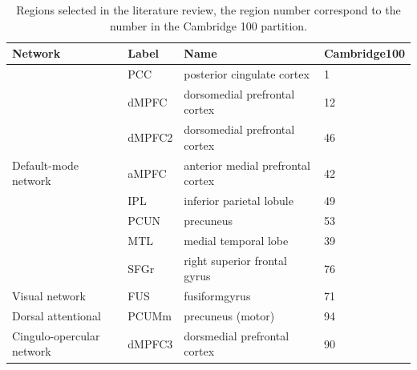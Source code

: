 \documentclass[authoryear]{elsarticle}
\begin{document}


\begin{table}[H]
\begin{center}
\begin{tabular}{l l l l}
\bfseries{Network} & \bfseries{Label} & \bfseries{Name} & \bfseries{Cambridge100}\\
\hline
 & PCC & posterior cingulate cortex & 1\\
 & dMPFC & dorsomedial prefrontal cortex & 12\\
 & dMPFC2 & dorsomedial prefrontal cortex & 46\\
Default-mode network & aMPFC & anterior medial prefrontal cortex & 42\\
 & IPL & inferior parietal lobule & 49\\
 & PCUN & precuneus & 53\\
 & MTL & medial temporal lobe & 39\\
 & SFGr & right superior frontal gyrus & 76\\
\hline
Visual network & FUS & fusiformgyrus & 71\\
\hline
Dorsal attentional & PCUMm & precuneus (motor) & 94\\
\hline
Cingulo-opercular network & dMPFC3 & dorsmedial prefrontal cortex & 90\\
\end{tabular}
\end{center}
\caption{Regions selected in the literature review, the region number correspond to the number in the Cambridge 100 partition.}
\label{tab_point-to-point}
\end{table}
\end{document}
